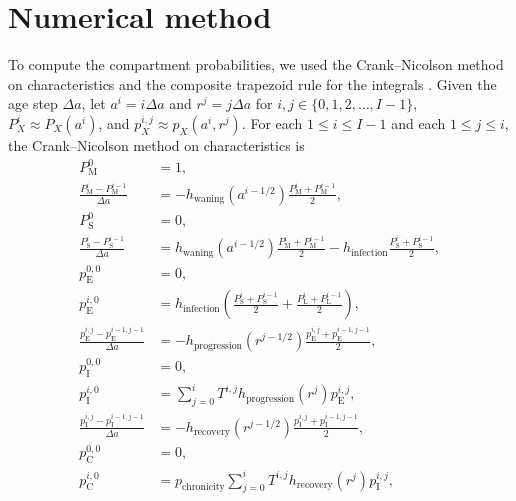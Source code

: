 \documentclass[12pt]{article}
\begin{document}
\section{Numerical method}

To compute the compartment probabilities, we used the Crank--Nicolson
method on characteristics and the composite trapezoid rule for the
integrals \citep{milner_1992}.  Given the age step $\Delta a$, let
$a^i = i \Delta a$ and $r^j = j \Delta a$ for $i, j \in \{0, 1, 2,
\ldots, I - 1\}$, $P_X^i \approx P_X(a^i)$, and $p_X^{i, j} \approx
p_X(a^i, r^j)$.
For each $1 \leq i \leq I - 1$ and each $1 \leq j \leq i$, the
Crank--Nicolson method on characteristics is
\begin{equation}
  \begin{split}
    P_{\mathrm{M}}^0 &= 1,
    \\
    \frac{P_{\mathrm{M}}^i - P_{\mathrm{M}}^{i - 1}}{\Delta a}
    &= - h_{\text{waning}}(a^{i - 1 / 2})
    \frac{P_{\mathrm{M}}^i + P_{\mathrm{M}}^{i - 1}}{2},
    \\
    P_{\mathrm{S}}^0 &= 0,
    \\
    \frac{P_{\mathrm{S}}^i - P_{\mathrm{S}}^{i - 1}}{\Delta a}
    &= h_{\text{waning}}(a^{i - 1 / 2})
    \frac{P_{\mathrm{M}}^i + P_{\mathrm{M}}^{i - 1}}{2}
    - h_{\text{infection}}
    \frac{P_{\mathrm{S}}^i + P_{\mathrm{S}}^{i - 1}}{2},
    \\
    p_{\mathrm{E}}^{0, 0} &= 0,
    \\
    p_{\mathrm{E}}^{i, 0} &= h_{\text{infection}}
    \left(\frac{P_{\mathrm{S}}^i + P_{\mathrm{S}}^{i - 1}}{2}
    + \frac{P_{\mathrm{L}}^i + P_{\mathrm{L}}^{i - 1}}{2}\right),
    \\
    \frac{p_{\mathrm{E}}^{i, j} - p_{\mathrm{E}}^{i - 1, j - 1}}{\Delta a}
    &= - h_{\text{progression}}(r^{j - 1 / 2})
    \frac{p_{\mathrm{E}}^{i, j} + p_{\mathrm{E}}^{i - 1, j - 1}}{2},
    \\
    p_{\mathrm{I}}^{0, 0} &= 0,
    \\
    p_{\mathrm{I}}^{i, 0} &=
    \sum_{j = 0}^i T^{i, j} h_{\text{progression}}(r^j) p_{\mathrm{E}}^{i, j},
    \\
    \frac{p_{\mathrm{I}}^{i, j} - p_{\mathrm{I}}^{i - 1, j - 1}}{\Delta a}
    &= - h_{\text{recovery}}(r^{j - 1 / 2})
    \frac{p_{\mathrm{I}}^{i, j} + p_{\mathrm{I}}^{i - 1, j - 1}}{2},
    \\
    p_{\mathrm{C}}^{0, 0} &= 0,
    \\
    p_{\mathrm{C}}^{i, 0} &= p_{\text{chronicity}}
    \sum_{j = 0}^i T^{i, j} h_{\text{recovery}}(r^j) p_{\mathrm{I}}^{i, j},

\end{split}
\end{equation}
\end{document}
